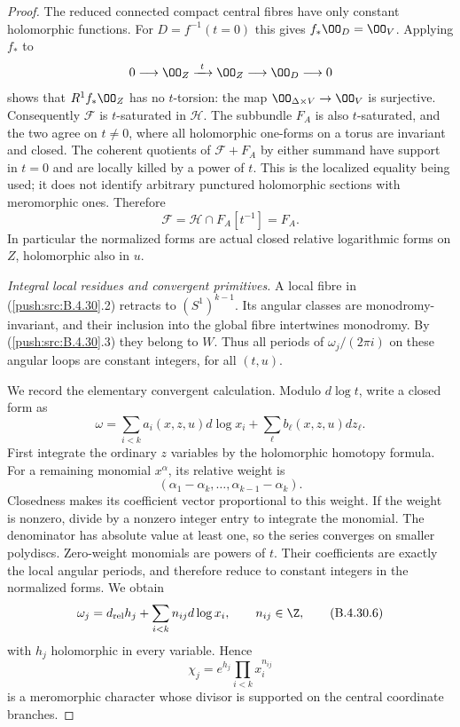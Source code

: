 \begin{proof}
The reduced connected compact central fibres
have only constant holomorphic functions.
For $D=f^{-1}(t=0)$ this gives
$f_*\OO_D=\OO_V$. Applying $f_*$ to
\[
 0\longrightarrow\OO_Z\xrightarrow{\ t\ }
 \OO_Z\longrightarrow\OO_D\longrightarrow0
\]
shows that $R^1f_*\OO_Z$ has no $t$-torsion:
the map $\OO_{\Delta\times V}\to\OO_V$ is
surjective. Consequently $\mathcal F$ is
$t$-saturated in $\mathcal H$. The subbundle
$F_A$ is also $t$-saturated, and the two agree
on $t\ne0$, where all holomorphic one-forms
on a torus are invariant and closed. The
coherent quotients of $\mathcal F+F_A$ by
either summand have support in $t=0$ and
are locally killed by a power of $t$. This
is the localized equality being used; it
does not identify arbitrary punctured
holomorphic sections with meromorphic ones.
Therefore
\[
 \mathcal F=\mathcal H\cap F_A[t^{-1}]=F_A.
 \tag{B.4.30.5}
\]
In particular the normalized forms are actual
closed relative logarithmic forms on $Z$,
holomorphic also in $u$.

\emph{Integral local residues and convergent primitives.}
A local fibre in (\ref{push:src:B.4.30}.2) retracts to
$(S^1)^{k-1}$. Its angular classes are
monodromy-invariant, and their inclusion into
the global fibre intertwines monodromy. By
(\ref{push:src:B.4.30}.3) they belong to $W$. Thus all periods
of $\omega_j/(2\pi i)$ on these angular loops
are constant integers, for all $(t,u)$.

We record the elementary convergent calculation.
Modulo $d\log t$, write a closed form as
\[
 \omega=\sum_{i<k}a_i(x,z,u)d\log x_i
                   +\sum_\ell b_\ell(x,z,u)dz_\ell.
\]
First integrate the ordinary $z$ variables by
the holomorphic homotopy formula. For a
remaining monomial $x^\alpha$, its relative
weight is
\[
 (\alpha_1-\alpha_k,\ldots,\alpha_{k-1}-\alpha_k).
\]
Closedness makes its coefficient vector
proportional to this weight. If the weight is
nonzero, divide by a nonzero integer entry to
integrate the monomial. The denominator has
absolute value at least one, so the series
converges on smaller polydiscs. Zero-weight
monomials are powers of $t$. Their coefficients
are exactly the local angular periods, and
therefore reduce to constant integers in the
normalized forms. We obtain
\[
 \omega_j=d_{\rm rel}h_j+
               \sum_{i<k}n_{ij}d\log x_i,
 \qquad n_{ij}\in\Z,
 \tag{B.4.30.6}
\]
with $h_j$ holomorphic in every variable.
Hence
\[
 \chi_j=e^{h_j}\prod_{i<k}x_i^{n_{ij}}
 \tag{B.4.30.7}
\]
is a meromorphic character whose divisor is
supported on the central coordinate branches.


\end{proof}
